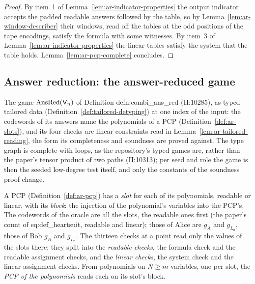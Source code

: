\begin{proof}
\leanok
By item~1 of Lemma~\ref{lem:ar-indicator-properties} the output indicator accepts the padded
readable answers followed by the table, so by Lemma~\ref{lem:ar-window-describer} their windows,
read off the tables at the odd positions of the tape encodings, satisfy the formula with some
witnesses. By item~3 of Lemma~\ref{lem:ar-indicator-properties} the linear tables satisfy the
system that the table holds. Lemma~\ref{lem:ar-pcp-complete} concludes.
\end{proof}

\subsection{Answer reduction: the answer-reduced game}

The game $\mathrm{AnsRed}(\mathsf{V}_n)$ of Definition defn:combi\_ans\_red (II:10285), as typed
tailored data (Definition~\ref{def:tailored-detyping}) at one index of the input: the codewords of
its answers name the polynomials of a PCP (Definition~\ref{def:ar-slots}), and its four checks
are linear constraints read in Lemma~\ref{lem:ar-tailored-reading}, the form its completeness and
soundness are proved against. The type graph is complete with loops, as the repository's typed
games are, rather than the paper's tensor product of two paths (II:10313); per seed and role the
game is then the seeded low-degree test itself, and only the constants of the soundness proof
change.

\begin{definition}
\label{def:ar-slots}
\leanok
A PCP (Definition~\ref{def:ar-pcp}) has a \emph{slot} for each of its polynomials, readable or
linear, with its \emph{block}: the injection of the polynomial's variables into the PCP's. The
codewords of the oracle are all the slots, the readable ones first (the paper's count of
eq:def\_heartsuit, readable and linear); those of Alice are $g_A$ and
$g_{L_a}$, those of Bob $g_B$ and $g_{L_b}$. The thirteen checks at a point read only the values
of the slots there; they split into the \emph{readable checks}, the formula check and the
readable assignment checks, and the \emph{linear checks}, the system check and the linear
assignment checks. From polynomials on $N \geq m$ variables, one per slot, the \emph{PCP of the
polynomials} reads each on its slot's block.
\end{definition}

